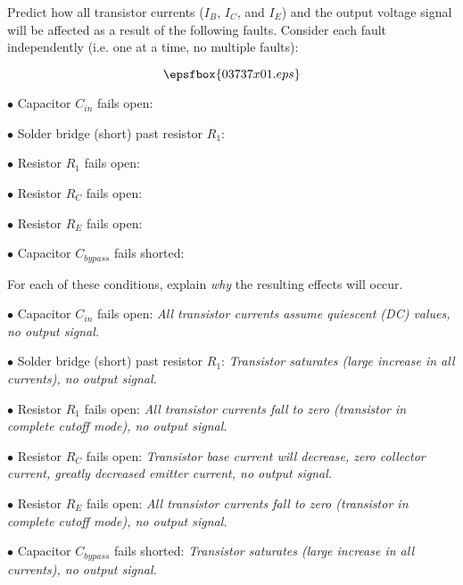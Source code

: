 

Predict how all transistor currents ($I_B$, $I_C$, and $I_E$) and the output voltage signal will be affected as a result of the following faults.  Consider each fault independently (i.e. one at a time, no multiple faults):

$$\epsfbox{03737x01.eps}$$

\medskip
\item{$\bullet$} Capacitor $C_{in}$ fails open:
\vskip 5pt
\item{$\bullet$} Solder bridge (short) past resistor $R_1$:
\vskip 5pt
\item{$\bullet$} Resistor $R_1$ fails open:
\vskip 5pt
\item{$\bullet$} Resistor $R_C$ fails open:
\vskip 5pt
\item{$\bullet$} Resistor $R_E$ fails open:
\vskip 5pt
\item{$\bullet$} Capacitor $C_{bypass}$ fails shorted:
\medskip

For each of these conditions, explain {\it why} the resulting effects will occur.







\medskip
\item{$\bullet$} Capacitor $C_{in}$ fails open: {\it All transistor currents assume quiescent (DC) values, no output signal.}
\vskip 5pt
\item{$\bullet$} Solder bridge (short) past resistor $R_1$: {\it Transistor saturates (large increase in all currents), no output signal.}
\vskip 5pt
\item{$\bullet$} Resistor $R_1$ fails open: {\it All transistor currents fall to zero (transistor in complete cutoff mode), no output signal.}
\vskip 5pt
\item{$\bullet$} Resistor $R_C$ fails open: {\it Transistor base current will decrease, zero collector current, greatly decreased emitter current, no output signal.}
\vskip 5pt
\item{$\bullet$} Resistor $R_E$ fails open: {\it All transistor currents fall to zero (transistor in complete cutoff mode), no output signal.}
\vskip 5pt
\item{$\bullet$} Capacitor $C_{bypass}$ fails shorted: {\it Transistor saturates (large increase in all currents), no output signal.} 
\medskip

